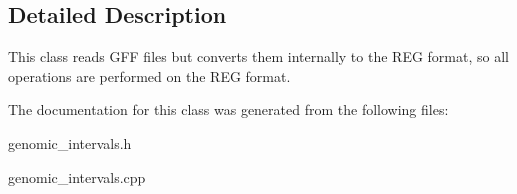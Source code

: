 \subsection{Detailed Description}
This class reads GFF files but converts them internally to the REG format, so all operations are performed on the REG format. 

The documentation for this class was generated from the following files:\begin{DoxyCompactItemize}
\item 
genomic\_\-intervals.h\item 
genomic\_\-intervals.cpp\end{DoxyCompactItemize}
